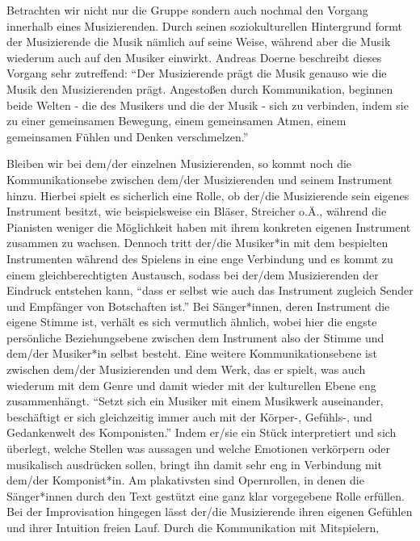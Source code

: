 Betrachten wir nicht nur die Gruppe sondern auch nochmal den Vorgang innerhalb
eines Musizierenden. Durch seinen soziokulturellen Hintergrund formt der
Musizierende die Musik nämlich auf seine Weise, während aber die Musik wiederum
auch auf den Musiker einwirkt. Andreas Doerne beschreibt dieses Vorgang sehr
zutreffend: \enquote{Der Musizierende prägt die Musik genauso wie die Musik den
Musizierenden prägt. Angestoßen durch Kommunikation, beginnen beide Welten - die
des Musikers und die der Musik - sich zu verbinden, indem sie zu einer
gemeinsamen Bewegung, einem gemeinsamen Atmen, einem gemeinsamen Fühlen und
Denken verschmelzen.} \autocite[60]{doerne:umfassend_musizieren}

Bleiben wir bei dem/der einzelnen Musizierenden, so kommt noch die
Kommunikationsebe zwischen dem/der Musizierenden und seinem Instrument hinzu.
Hierbei spielt es sicherlich eine Rolle, ob der/die Musizierende sein eigenes
Instrument besitzt, wie beispielsweise ein Bläser, Streicher o.Ä., während die
Pianisten weniger die Möglichkeit haben mit ihrem konkreten eigenen Instrument
zusammen zu wachsen. Dennoch tritt der/die Musiker*in mit dem bespielten
Instrumenten während des Spielens in eine enge Verbindung und es kommt zu einem
gleichberechtigten Austausch, sodass bei der/dem Musizierenden der Eindruck
entstehen kann, \enquote{dass er selbst wie auch das Instrument zugleich Sender
und Empfänger von Botschaften ist.} \autocite[59]{doerne:umfassend_musizieren}
Bei Sänger*innen, deren Instrument die eigene Stimme ist, verhält es sich
vermutlich ähnlich, wobei hier die engste persönliche Beziehungsebene zwischen
dem Instrument also der Stimme und dem/der Musiker*in selbst besteht. Eine
weitere Kommunikationsebene ist zwischen dem/der Musizierenden und dem Werk, das
er spielt, was auch wiederum mit dem Genre und damit wieder mit der kulturellen
Ebene eng zusammenhängt. \enquote{Setzt sich ein Musiker mit einem Musikwerk
auseinander, beschäftigt er sich gleichzeitig immer auch mit der Körper-,
Gefühls-, und Gedankenwelt des Komponisten.}
\autocite[59]{doerne:umfassend_musizieren} Indem er/sie ein Stück interpretiert
und sich überlegt, welche Stellen was aussagen und welche Emotionen verkörpern
oder musikalisch ausdrücken sollen, bringt ihn damit sehr eng in Verbindung mit
dem/der Komponist*in. Am plakativsten sind Opernrollen, in denen die
Sänger*innen durch den Text gestützt eine ganz klar vorgegebene Rolle erfüllen.
Bei der Improvisation hingegen lässt der/die Musizierende ihren eigenen Gefühlen
und ihrer Intuition freien Lauf. Durch die Kommunikation mit Mitspielern,
